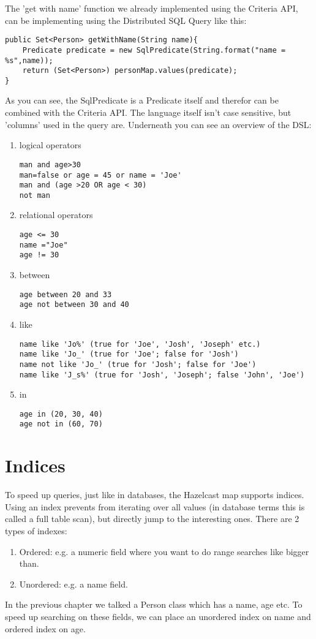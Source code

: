 The 'get with name' function we already implemented using the Criteria API, can be implementing using the Distributed SQL Query like this:
\begin{lstlisting}
public Set<Person> getWithName(String name){
    Predicate predicate = new SqlPredicate(String.format("name = %s",name));
    return (Set<Person>) personMap.values(predicate);
}
\end{lstlisting}
As you can see, the SqlPredicate is a Predicate itself and therefor can be combined with the Criteria API. The language itself isn't case sensitive, but 'columns' used in the query are. Underneath you can see an overview of the DSL:
\begin{enumerate}
	\item logical operators
	\begin{lstlisting}
man and age>30
man=false or age = 45 or name = 'Joe'
man and (age >20 OR age < 30)
not man
	\end{lstlisting}

	\item relational operators
	\begin{lstlisting}
age <= 30
name ="Joe"
age != 30
	\end{lstlisting}

	\item between
	\begin{lstlisting}
age between 20 and 33
age not between 30 and 40
	\end{lstlisting}

	\item like
	\begin{lstlisting}
name like 'Jo%' (true for 'Joe', 'Josh', 'Joseph' etc.)
name like 'Jo_' (true for 'Joe'; false for 'Josh')
name not like 'Jo_' (true for 'Josh'; false for 'Joe')
name like 'J_s%' (true for 'Josh', 'Joseph'; false 'John', 'Joe')
	\end{lstlisting}
	\item in
	\begin{lstlisting}
age in (20, 30, 40)
age not in (60, 70)
	\end{lstlisting}
\end{enumerate}

\section{Indices}
To speed up queries, just like in databases, the Hazelcast map supports indices. Using an index prevents from iterating over all values (in database terms this is called a full table scan), but directly jump to the interesting ones. There are 2 types of indexes:
\begin{enumerate}
\item Ordered: e.g. a numeric field where you want to do range searches like bigger than.
\item Unordered: e.g. a name field.
\end{enumerate}
In the previous chapter we talked a Person class which has a name, age etc. To speed up searching on these fields, we can place an unordered index on name and ordered index on age. 

